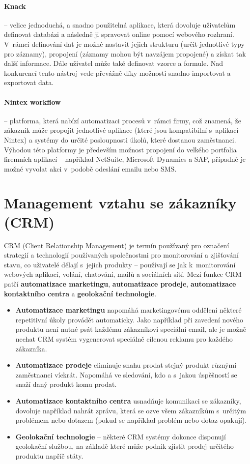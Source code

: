 \paragraph{Knack} -- velice jednoduchá, a snadno použitelná aplikace, která dovoluje uživatelům definovat databázi a následně ji spravovat online pomocí webového rozhraní. V~rámci definování dat je možné nastavit jejich strukturu (určit jednotlivé typy pro záznamy), propojení (záznamy mohou být navzájem propojené) a získat tak další informace. Dále uživatel může také definovat vzorce a formule. Nad konkurencí tento nástroj vede převážně díky možnosti snadno importovat a exportovat data.

\paragraph{Nintex workflow} -- platforma, která nabízí automatizaci procesů v~rámci firmy, což znamená, že zákazník může propojit jednotlivé aplikace (které jsou kompatibilní s~aplikací Nintex) a systémy do určité posloupnosti úkolů, které dostanou zaměstnanci. Výhodou této platformy je především možnost propojení do velkého portfolia firemních aplikací -- například NetSuite, Microsoft Dynamics a SAP, případně je možné vyvolat akci v~podobě odeslání emailu nebo SMS.

\section{Management vztahu se zákazníky (CRM)}
\par CRM (Client Relationship Management) je termín používaný pro označení strategií a technologií používaných společnostmi pro monitorování a zjišťování stavu, co uživatelé dělají s~jejich produkty -- používají se jak k~monitorování webových aplikací, volání, chatování, mailů a sociálních sítí. Mezi funkce CRM patří \textbf{automatizace marketingu}, \textbf{automatizace prodeje}, \textbf{automatizace kontaktního centra} a \textbf{geolokační technologie}. \cite{crm}

\begin{itemize}
\item \textbf{Automatizace marketingu} napomáhá marketingovému oddělení některé repetitivní úkoly provádět automaticky. Jako například při zavedení nového produktu není nutné psát každému zákazníkovi speciální email, ale je možně nechat CRM systém vygenerovat speciálně cílenou reklamu pro každého zákazníka.
\item \textbf{Automatizace prodeje} eliminuje snahu prodat stejný produkt různými zaměstnanci víckrát. Napomáhá ve sledování, kdo a s~jakou úspěšností se snaží daný produkt komu prodat.
\item \textbf{Automatizace kontaktního centra} usnadňuje komunikaci se zákazníky, dovoluje například nahrát zprávu, která se ozve všem zákazníkům s~určitým problémem nebo dotazem (pokud se například problém nebo dotaz opakují).
\item \textbf{Geolokační technologie} -- některé CRM systémy dokonce disponují geolokační službou, na základě které může podnik zjistit prodej určitého produktu napříč státy. \cite{crm}
\end{itemize}


